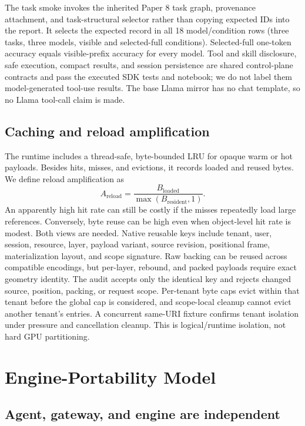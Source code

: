 \documentclass[11pt]{article}
\begin{document}
The task smoke invokes the inherited Paper 8 task graph, provenance attachment,
and task-structural selector rather than copying expected IDs into the
report. It selects the expected record in all 18 model/condition rows (three
tasks, three models, visible and selected-full conditions). Selected-full
one-token accuracy equals visible-prefix accuracy for every model. Tool and
skill disclosure, safe execution, compact results, and session persistence are
shared control-plane contracts and pass the executed SDK tests and notebook;
we do not label them model-generated tool-use results. The base Llama mirror has
no chat template, so no Llama tool-call claim is made.

\subsection{Caching and reload amplification}

The runtime includes a thread-safe, byte-bounded LRU for opaque warm or hot
payloads.  Besides hits, misses, and evictions, it records loaded and reused
bytes.  We define reload amplification as
\begin{equation}
A_{\mathrm{reload}} = \frac{B_{\mathrm{loaded}}}{\max(B_{\mathrm{resident}},1)}.
\end{equation}
An apparently high hit rate can still be costly if the misses repeatedly load
large references.  Conversely, byte reuse can be high even when object-level
hit rate is modest.  Both views are needed.
Native reusable keys include tenant, user, session, resource, layer, payload
variant, source revision, positional frame, materialization layout, and scope
signature. Raw backing can be reused across compatible encodings, but per-layer,
rebound, and packed payloads require exact geometry identity. The audit accepts
only the identical key and rejects changed source, position, packing, or request
scope. Per-tenant byte caps evict within that tenant before the global
cap is considered, and scope-local cleanup cannot evict another tenant's
entries. A concurrent same-URI fixture confirms tenant isolation under pressure
and cancellation cleanup. This is logical/runtime isolation, not hard GPU
partitioning.

\section{Engine-Portability Model}

\subsection{Agent, gateway, and engine are independent}
\end{document}
